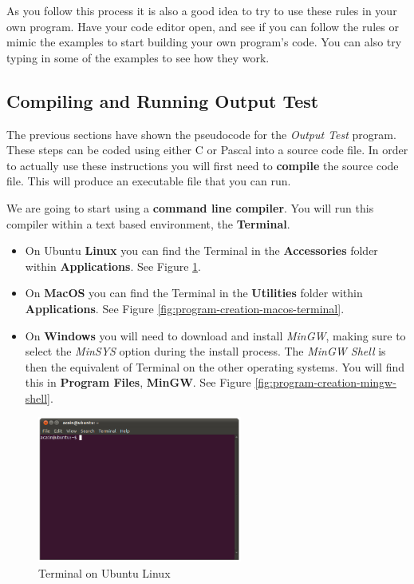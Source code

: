 As you follow this process it is also a good idea to try to use these rules in your own program. Have your code editor open, and see if you can follow the rules or mimic the examples to start building your own program's code. You can also try typing in some of the examples to see how they work.



\subsection{Compiling and Running Output Test} %
\label{sub:compiling_and_running_output_test}

The previous sections have shown the pseudocode for the \emph{Output Test} program. These steps can be coded using either C or Pascal into a source code file. In order to actually use these instructions you will first need to \textbf{compile} the source code file. This will produce an executable file that you can run.

We are going to start using a \textbf{command line compiler}. You will run this compiler within a text based environment, the \textbf{Terminal}. 

\begin{itemize}
  \item On Ubuntu \textbf{Linux} you can find the Terminal in the \textbf{Accessories} folder within \textbf{Applications}. See Figure \ref{fig:program-creation-ubuntu-terminal}.
  \item On \textbf{MacOS} you can find the Terminal in the \textbf{Utilities} folder within \textbf{Applications}. See Figure \ref{fig:program-creation-macos-terminal}.
  \item On \textbf{Windows} you will need to download and install \emph{MinGW}, making sure to select the \emph{MinSYS} option during the install process. The \emph{MinGW Shell} is then the equivalent of Terminal on the other operating systems. You will find this in \textbf{Program Files}, \textbf{MinGW}. See Figure \ref{fig:program-creation-mingw-shell}.
\end{itemize}

\begin{figure}[p]
   \centering
   \includegraphics[width=0.6\textwidth]{./topics/program-creation/images/UbuntuTerminal} 
   \caption{Terminal on Ubuntu Linux}
   \label{fig:program-creation-ubuntu-terminal}
\end{figure}

